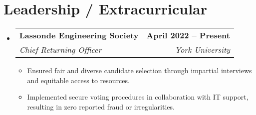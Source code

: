 \documentclass[letterpaper,11pt]{article}
\makeatletter
\newcommand{\resumeItem}[1]{
  \item\small{
    {#1 \vspace{-2pt}}
  }
}
\newcommand{\resumeSubheading}[4]{
  \vspace{-2pt}\item
    \begin{tabular*}{1.0\textwidth}[t]{l@{\extracolsep{\fill}}r}
      \textbf{#1} & \textbf{\small #2} \\
      \textit{\small#3} & \textit{\small #4} \\
    \end{tabular*}\vspace{-7pt}
}
\newcommand{\resumeSubHeadingListStart}{\begin{itemize}[leftmargin=0.0in, label={}]}
\newcommand{\resumeSubHeadingListEnd}{\end{itemize}}
\newcommand{\resumeItemListStart}{\begin{itemize}}
\newcommand{\resumeItemListEnd}{\end{itemize}\vspace{-5pt}}
\makeatother
\begin{document}
\section{Leadership / Extracurricular}
    \resumeSubHeadingListStart
        \resumeSubheading{Lassonde Engineering Society}{April 2022 -- Present}{Chief Returning Officer}{York University}
            \resumeItemListStart
           \resumeItem{Ensured fair and diverse candidate selection through impartial interviews and equitable access to resources.}
             \resumeItem{Implemented secure voting procedures in collaboration with IT support, resulting in zero reported fraud or irregularities.}
            \resumeItemListEnd
        
    \resumeSubHeadingListEnd
\end{document}
